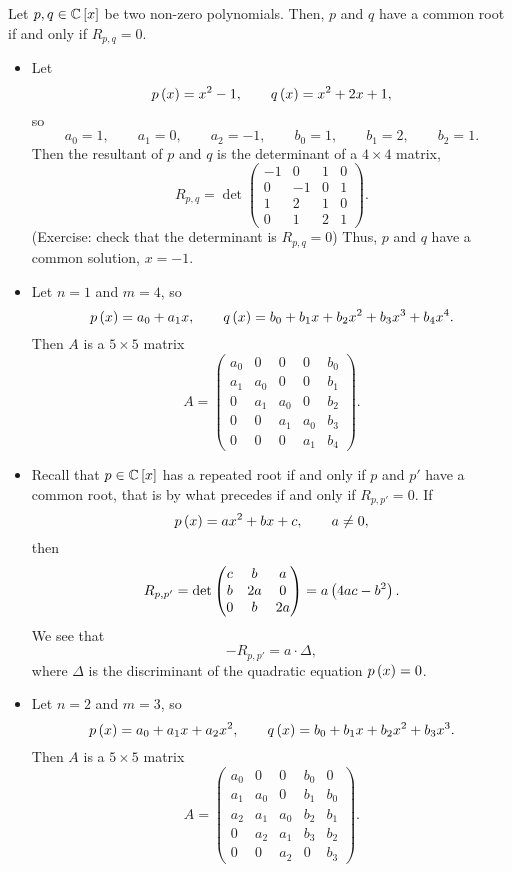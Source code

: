 \begin{theorem}
\label{thm:9.3}
Let $ p, q \in \mathbb{C}\left[ x \right] $ be two non-zero polynomials. Then, $ p $ and $ q $ have a common root if and only if $ R_{p, q} = 0 $.
\end{theorem}

\begin{example}
\hfill
\begin{itemize}
\item Let
$$ p\left( x \right) = x^2 - 1, \qquad q\left( x \right) = x^2 + 2x + 1, $$
so
$$ a_0 = 1, \qquad a_1 = 0, \qquad a_2 = -1, \qquad b_0 = 1, \qquad b_1 = 2, \qquad b_2 = 1. $$
Then the resultant of $ p $ and $ q $ is the determinant of a $ 4 \times 4 $ matrix,
$$ R_{p, q} = \det
\begin{pmatrix}
-1 & 0 & 1 & 0 \\
0 & -1 & 0 & 1 \\
1 & 2 & 1 & 0 \\
0 & 1 & 2 & 1
\end{pmatrix}.
$$
(Exercise: check that the determinant is $ R_{p, q} = 0 $) Thus, $ p $ and $ q $ have a common solution, $ x = -1 $.
\item Let $ n = 1 $ and $ m = 4 $, so
$$ p\left( x \right) = a_0 + a_1x, \qquad q\left( x \right) = b_0 + b_1x + b_2x^2 + b_3x^3 + b_4x^4. $$
Then $ A $ is a $ 5 \times 5 $ matrix
$$ A =
\begin{pmatrix}
a_0 & 0 & 0 & 0 & b_0 \\
a_1 & a_0 & 0 & 0 & b_1 \\
0 & a_1 & a_0 & 0 & b_2 \\
0 & 0 & a_1 & a_0 & b_3 \\
0 & 0 & 0 & a_1 & b_4
\end{pmatrix}.
$$
\item Recall that $ p \in \mathbb{C}\left[ x \right] $ has a repeated root if and only if $ p $ and $ p' $ have a common root, that is by what precedes if and only if $ R_{p, p'} = 0 $. If
$$ p\left( x \right) = ax^2 + bx + c, \qquad a \ne 0, $$
then
$$ R_{p, p'} = \det\begin{pmatrix} c & b & a \\ b & 2a & 0 \\ 0 & b & 2a \end{pmatrix} = a\left( 4ac - b^2 \right). $$
We see that
$$ -R_{p, p'} = a \cdot \Delta, $$
where $ \Delta $ is the discriminant of the quadratic equation $ p\left( x \right) = 0 $.
\item Let $ n = 2 $ and $ m = 3 $, so
$$ p\left( x \right) = a_0 + a_1x + a_2x^2, \qquad q\left( x \right) = b_0 + b_1x + b_2x^2 + b_3x^3. $$
Then $ A $ is a $ 5 \times 5 $ matrix
$$ A =
\begin{pmatrix}
a_0 & 0 & 0 & b_0 & 0 \\
a_1 & a_0 & 0 & b_1 & b_0 \\
a_2 & a_1 & a_0 & b_2 & b_1 \\
0 & a_2 & a_1 & b_3 & b_2 \\
0 & 0 & a_2 & 0 & b_3
\end{pmatrix}.
$$
\end{itemize}
\end{example}

